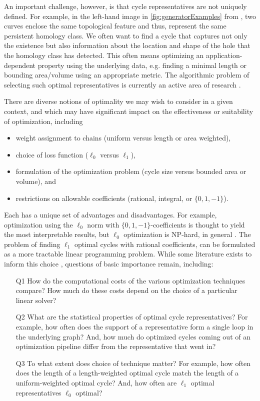 An important challenge, however, is that cycle representatives are not uniquely defined. For example, in the left-hand image in \fig \ref{fig:generatorExamples} from \cite{Carlsson2009TopologyAD}, two curves enclose the same topological feature and thus, represent the same persistent homology class. We often want to find a cycle that captures not only the existence but also information about the location and shape of the hole that the homology class has detected. This often means optimizing an application-dependent property using the underlying data, e.g. finding a minimal length or bounding area/volume using an appropriate metric. The algorithmic problem of selecting such optimal representatives is currently an active area of research \cite{dey2011optimal,dey2018,Obayashi2018,wu,chen2010measuring}. 

There are diverse notions of optimality we may wish to consider in a given context, and which may have significant impact on the effectiveness or suitability of  optimization, including  
\begin{itemize}
    \item weight assignment to chains (uniform versus length or area weighted), 
 \item choice of loss function ($\ell_0$ versus $\ell_1$), 
 \item formulation of the optimization problem (cycle size versus bounded area or volume), and \item restrictions on allowable coefficients (rational, integral, or $\{0,1,-1\}$).  
 \end{itemize}
 Each has a unique set of advantages and disadvantages. For example, optimization using the $\ell_0$ norm with $\{0, 1, -1\}$-coefficients is thought to yield the most interpretable results, but $\ell_0$ optimization is NP-hard, in general \cite{chenhardness}. 
The problem of finding $\ell_1$ optimal cycles with rational coefficients, can be formulated as a more tractable linear programming problem.
While some literature exists to inform this choice \cite{dey2011optimal,Escolar2016,Obayashi2018}, questions of basic importance remain, including: 

\begin{enumerate}
  \item[Q1] How do the computational costs of the various optimization techniques compare? How much do these costs depend on the choice of a particular linear solver? 
  \item[Q2] What are the statistical properties of optimal cycle representatives? For example,  how often does the support of a representative form a single loop in the underlying graph? And,  how much do optimized cycles coming out of an optimization pipeline differ from the representative that went in?     
    \item[Q3] To what extent does choice of technique matter? For example, how often does the length of a length-weighted optimal cycle match the length of a uniform-weighted optimal cycle? 
    And, how often are $\ell_1$ optimal representatives $\ell_0$ optimal? 
\end{enumerate}

